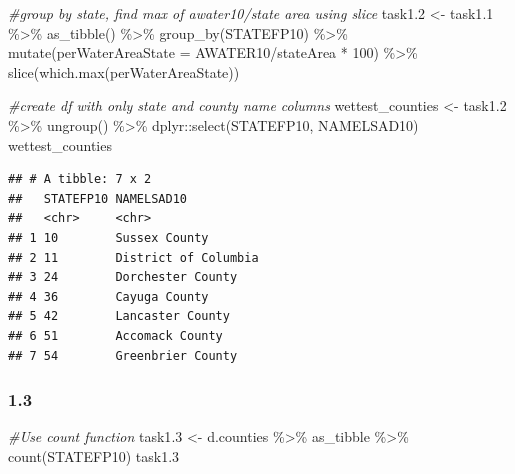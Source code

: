 \documentclass[
]{article}
\newenvironment{Shaded}{\begin{snugshade}}{\end{snugshade}}
\newcommand{\AttributeTok}[1]{\textcolor[rgb]{0.77,0.63,0.00}{#1}}
\newcommand{\CommentTok}[1]{\textcolor[rgb]{0.56,0.35,0.01}{\textit{#1}}}
\newcommand{\DecValTok}[1]{\textcolor[rgb]{0.00,0.00,0.81}{#1}}
\newcommand{\FloatTok}[1]{\textcolor[rgb]{0.00,0.00,0.81}{#1}}
\newcommand{\FunctionTok}[1]{\textcolor[rgb]{0.00,0.00,0.00}{#1}}
\newcommand{\NormalTok}[1]{#1}
\newcommand{\OtherTok}[1]{\textcolor[rgb]{0.56,0.35,0.01}{#1}}
\newcommand{\SpecialCharTok}[1]{\textcolor[rgb]{0.00,0.00,0.00}{#1}}
\begin{document}
\begin{Shaded}
\begin{Highlighting}[]
\CommentTok{\#group by state, find max of awater10/state area using slice}
\NormalTok{task1}\FloatTok{.2} \OtherTok{\textless{}{-}}\NormalTok{ task1}\FloatTok{.1} \SpecialCharTok{\%\textgreater{}\%} \FunctionTok{as\_tibble}\NormalTok{() }\SpecialCharTok{\%\textgreater{}\%} 
  \FunctionTok{group\_by}\NormalTok{(STATEFP10) }\SpecialCharTok{\%\textgreater{}\%} 
  \FunctionTok{mutate}\NormalTok{(}\AttributeTok{perWaterAreaState =}\NormalTok{ AWATER10}\SpecialCharTok{/}\NormalTok{stateArea }\SpecialCharTok{*} \DecValTok{100}\NormalTok{) }\SpecialCharTok{\%\textgreater{}\%} 
  \FunctionTok{slice}\NormalTok{(}\FunctionTok{which.max}\NormalTok{(perWaterAreaState))}

\CommentTok{\#create df with only state and county name columns}
\NormalTok{wettest\_counties }\OtherTok{\textless{}{-}}\NormalTok{ task1}\FloatTok{.2} \SpecialCharTok{\%\textgreater{}\%} \FunctionTok{ungroup}\NormalTok{() }\SpecialCharTok{\%\textgreater{}\%} 
\NormalTok{  dplyr}\SpecialCharTok{::}\FunctionTok{select}\NormalTok{(STATEFP10, NAMELSAD10)}
\NormalTok{wettest\_counties}
\end{Highlighting}
\end{Shaded}

\begin{verbatim}
## # A tibble: 7 x 2
##   STATEFP10 NAMELSAD10          
##   <chr>     <chr>               
## 1 10        Sussex County       
## 2 11        District of Columbia
## 3 24        Dorchester County   
## 4 36        Cayuga County       
## 5 42        Lancaster County    
## 6 51        Accomack County     
## 7 54        Greenbrier County
\end{verbatim}

\hypertarget{section-2}{%
\subsubsection{1.3}\label{section-2}}

\begin{Shaded}
\begin{Highlighting}[]
\CommentTok{\#Use count function }
\NormalTok{task1}\FloatTok{.3} \OtherTok{\textless{}{-}}\NormalTok{ d.counties }\SpecialCharTok{\%\textgreater{}\%}\NormalTok{ as\_tibble }\SpecialCharTok{\%\textgreater{}\%} 
  \FunctionTok{count}\NormalTok{(STATEFP10)}
\NormalTok{task1}\FloatTok{.3}
\end{Highlighting}
\end{Shaded}
\end{document}
